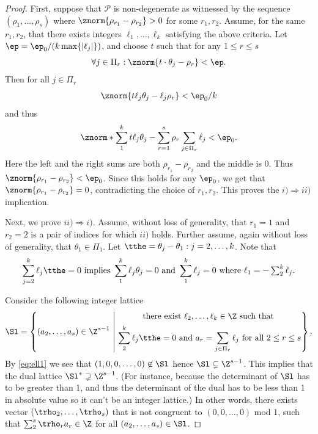 \begin{proof}
First, suppose that $\mathcal{P}$ is non-degenerate as witnessed by the sequence $(\rho_1,\dots, \rho_s)$ where $\znorm{\rho_{r_1} - \rho_{r_2}} > 0$ for some $r_1, r_2$. Assume, for the same $r_1,r_2$, that there exists integers $\ell_1,\dots, \ell_k$ satisfying the above criteria. Let $\ep = \ep_0/(k \max\{|\ell_j|\})$, and choose $t$ such that  for any $1 \leq r \leq s$ 
\begin{equation*} \forall j \in \Pi_r : \znorm{ t \cdot \theta_j - \rho_r} < \ep.
\end{equation*}
Then for all $j\in \Pi_r$
\[ \znorm{ t \ell_j \theta_j - \ell_j \rho_r} < \ep_0/k\] 
and thus
\[ \znorm*{ \sum_1^k t \ell_j \theta_j - \sum_{r=1}^s \rho_r \sum_{j \in \Pi_r} \ell_j } < \ep_0.
\]
Here the left and the right sums are both $\rho_{r_1}-\rho_{r_2}$ and the middle is 0. Thus $\znorm{\rho_{r_1} - \rho_{r_2}} < \ep_0$. Since this holds for any $\ep_0$, we get that $\znorm{\rho_{r_1} - \rho_{r_2}}=0$, contradicting the choice of $r_1,r_2$. This proves the $i) \Rightarrow ii)$ implication.

Next, we prove $ii) \Rightarrow i)$. Assume, without loss of generality, that $r_1 = 1$ and $r_2 = 2$ is a pair of indices for which $ii)$ holds. Further assume, again without loss of generality, that $\theta_1 \in \Pi_1$.  Let $\tthe = \theta_j - \theta_1 : j = 2, \dots, k$. Note that 
\begin{equation}\label{eq:ell1} \sum_{j=2}^k \ell_j \tthe = 0 \mbox{ implies } \sum_1^k \ell_j \theta_j = 0 \mbox{ and } \sum_1^k \ell_j = 0 \mbox{ where $\ell_1 = -\sum_2^k \ell_j$}.\end{equation}

Consider the following integer lattice 
\[ \Sl = \left\{ (a_2, \dots, a_s) \in \Z^{s-1} \ \middle\vert\ \begin{gathered}\text{there exist } \ell_2, \dots, \ell_k \in \Z \text{ such that } \\ \sum_2^k \ell_j \tthe = 0 \text{ and } a_r = \sum_{j \in \Pi_r} \ell_j  \text{ for all } 2 \leq r \leq s \end{gathered} \right\}.\]
By \eqref{eq:ell1} we see that $(1,0,0,\dots,0) \not \in \Sl$ hence $\Sl \subsetneq \Z^{s-1}$. This implies that the dual lattice $\Sl^* \supsetneq \Z^{s-1}$. (For instance, because the determinant of $\Sl$ has to be greater than 1, and thus the determinant of the dual has to be less than 1 in absolute value so it can't be an integer lattice.) In other words, there exists vector $(\trho_2,\dots, \trho_s)$ that is not congruent to $(0,0,\dots,0)$ mod 1, such that $\sum_2^s \trho_r a_r \in \Z$ for all $(a_2,\dots,a_s) \in \Sl$. 


\end{proof}
